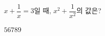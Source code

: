 \hspace*{2mm}\begin{minipage}[t]{\dimexpr\linewidth-2mm\relax}\vspace{0pt}
$x+\dfrac{1}{x}=3$일 때, $x^2+\dfrac{1}{x^2}$의 값은?
\begin{choices32}{$5$}{$6$}{$7$}{$8$}{$9$}\end{choices32}\end{minipage}
